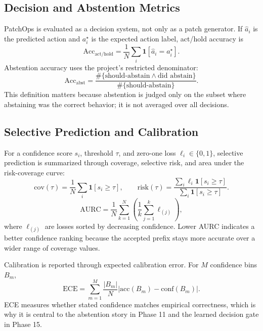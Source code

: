 \subsection{Decision and Abstention Metrics}

PatchOps is evaluated as a decision system, not only as a patch generator. If \(\hat{a}_i\) is the predicted
action and \(a_i^\star\) is the expected action label, act/hold accuracy is
\begin{equation}
\mathrm{Acc}_{\mathrm{act/hold}} = \frac{1}{N}\sum_i \mathbf{1}[\hat{a}_i = a_i^\star].
\end{equation}
Abstention accuracy uses the project's restricted denominator:
\begin{equation}
\mathrm{Acc}_{\mathrm{abst}} =
\frac{\#\{\text{should-abstain} \wedge \text{did abstain}\}}{\#\{\text{should-abstain}\}}.
\end{equation}
This definition matters because abstention is judged only on the subset where abstaining was the correct
behavior; it is not averaged over all decisions.

\subsection{Selective Prediction and Calibration}

For a confidence score \(s_i\), threshold \(\tau\), and zero-one loss \(\ell_i \in \{0,1\}\), selective
prediction is summarized through coverage, selective risk, and area under the risk-coverage curve:
\begin{equation}
\mathrm{cov}(\tau) = \frac{1}{N}\sum_i \mathbf{1}[s_i \ge \tau],
\qquad
\mathrm{risk}(\tau) = \frac{\sum_i \ell_i \mathbf{1}[s_i \ge \tau]}
{\sum_i \mathbf{1}[s_i \ge \tau]}.
\end{equation}
\begin{equation}
\mathrm{AURC} = \frac{1}{N}\sum_{k=1}^{N}\left(\frac{1}{k}\sum_{j=1}^{k}\ell_{(j)}\right),
\end{equation}
where \(\ell_{(j)}\) are losses sorted by decreasing confidence. Lower AURC indicates a better confidence
ranking because the accepted prefix stays more accurate over a wider range of coverage values.

Calibration is reported through expected calibration error. For \(M\) confidence bins \(B_m\),
\begin{equation}
\mathrm{ECE} = \sum_{m=1}^{M}\frac{|B_m|}{N}\left|\mathrm{acc}(B_m) - \mathrm{conf}(B_m)\right|.
\end{equation}
ECE measures whether stated confidence matches empirical correctness, which is why it is central to the
abstention story in Phase 11 and the learned decision gate in Phase 15.

